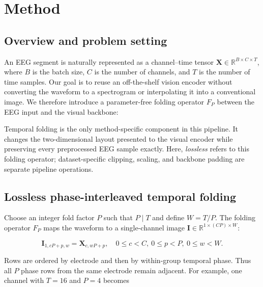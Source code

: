 \section{Method}
\label{sec:method}

\subsection{Overview and problem setting}

An EEG segment is naturally represented as a channel--time tensor
$\mathbf{X}\in\mathbb{R}^{B\times C\times T}$, where $B$ is the batch size,
$C$ is the number of channels, and $T$ is the number of time samples. Our goal
is to reuse an off-the-shelf vision encoder without converting the waveform to
a spectrogram or interpolating it into a conventional image. We therefore
introduce a parameter-free folding operator $F_P$ between the EEG input and
the visual backbone:

\begin{center}
\end{center}

Temporal folding is the only method-specific component in this pipeline. It
changes the two-dimensional layout presented to the visual encoder while
preserving every preprocessed EEG sample exactly. Here, \emph{lossless}
refers to this folding operator; dataset-specific clipping, scaling, and
backbone padding are separate pipeline operations.

\subsection{Lossless phase-interleaved temporal folding}

Choose an integer fold factor $P$ such that $P\mid T$ and define
$W=T/P$.  The folding operator $F_P$ maps the waveform to a single-channel
image $\mathbf{I}\in\mathbb{R}^{1\times(CP)\times W}$:

\begin{equation}
\label{eq:fold}
  \mathbf{I}_{1,cP+p,w}
  = \mathbf{X}_{c,wP+p},
  \quad
  0\leq c<C,\ 0\leq p<P,\ 0\leq w<W.
\end{equation}

Rows are ordered by electrode and then by within-group temporal phase.  Thus
all $P$ phase rows from the same electrode remain adjacent.  For example, one
channel with $T=16$ and $P=4$ becomes

